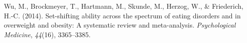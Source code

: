 \documentclass[
  man,floatsintext]{apa6}
\newlength{\cslhangindent}
\newlength{\cslentryspacingunit} %
\newenvironment{CSLReferences}[2] %
 {%
  \setlength{\parindent}{0pt}
  \ifodd #1
  \let\oldpar\par
  \def\par{\hangindent=\cslhangindent\oldpar}
  \fi
  \setlength{\parskip}{#2\cslentryspacingunit}
 }%
 {}
\begin{document}
\begin{CSLReferences}{1}{0}
\leavevmode{}%
Wu, M., Brockmeyer, T., Hartmann, M., Skunde, M., Herzog, W., \& Friederich, H.-C. (2014). Set-shifting ability across the spectrum of eating disorders and in overweight and obesity: A systematic review and meta-analysis. \emph{Psychological Medicine}, \emph{44}(16), 3365--3385.

\end{CSLReferences}
\end{document}
